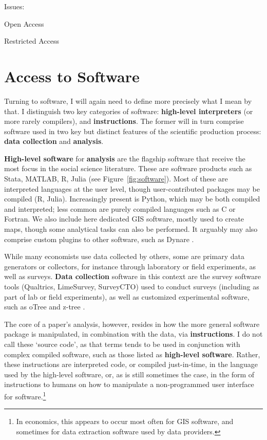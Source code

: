 \documentclass{article}
\begin{document}
Issues:

Open Access

Restricted Access


\section{Access to Software}
\label{sec:software}

Turning to software, I will again need to define more precisely what I mean by that. I distinguish two key categories of software: \textbf{high-level interpreters} (or more rarely compilers), and \textbf{instructions}. The former will in turn comprise software used in two key but distinct features of the scientific production process: \textbf{data collection} and \textbf{analysis}. 

\textbf{High-level software} for \textbf{analysis} are the flagship software  that receive the most  focus in the social science literature. These are software products such as Stata, MATLAB, R, Julia (see Figure~\ref{fig:software}). Most of these are interpreted languages at the user level, though user-contributed packages may be compiled (R, Julia). Increasingly present is Python, which may be both compiled and interpreted; less common are purely compiled languages such as C or Fortran. We also include here dedicated \ac{GIS} software, mostly used to create maps, though some analytical tasks can also be performed. It arguably may also comprise custom plugins to other software, such as Dynare \citep{adjemian_dynare_2024,cherrier_write_2023}.



While many economists use data collected by others, some are primary data generators or collectors, for instance through laboratory or field experiments, as well as surveys. \textbf{Data collection} software in this context are the survey software tools (Qualtrics, LimeSurvey, SurveyCTO) used to conduct surveys (including as part of lab or field experiments), as well as customized experimental software, such as oTree \citep{chen_otreeopen-source_2016} and z-tree \citep{fischbache_z-tree_2021}.

The core of a paper's analysis, however, resides in how the more general software package is manipulated, in combination with the data, via \textbf{instructions}. I do not call these `source code', as that terms tends to be used in conjunction with complex compiled software, such as those listed as \textbf{high-level software}. Rather, these instructions are interpreted code, or compiled just-in-time, in the language used by the high-level software, or, as is still sometimes the case, in the form of instructions to humans on how to manipulate a non-programmed user interface for software.\footnote{In economics, this appears to occur most often for \ac{GIS} software, and sometimes for data extraction software used by data providers.}
\end{document}
